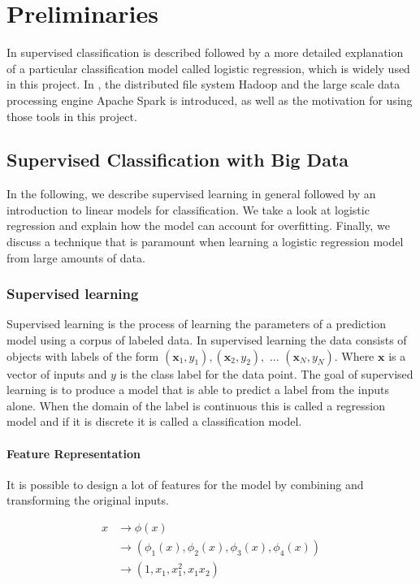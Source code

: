 \section{Preliminaries}\label{sec:prelim}
In  supervised classification is described followed by a more detailed explanation of a particular classification model called logistic regression, which is widely used in this project. In , the distributed file system Hadoop and the large scale data processing engine Apache Spark is introduced, as well as the motivation for using those tools in this project.

\subsection{Supervised Classification with Big Data}
\label{sec:supervisedclassification}
In the following, we describe supervised learning in general followed by an introduction to linear models for classification.
We take a look at logistic regression and explain how the model can account for overfitting. 
Finally, we discuss a technique that is paramount when learning a logistic regression model from large amounts of data.

\subsubsection{Supervised learning}
Supervised learning is the process of learning the parameters of a prediction model using a corpus of labeled data.
In supervised learning the data consists of objects with labels of the form 
$(\textbf{x}_1,y_1),(\textbf{x}_2,y_2), \text{ ... } (\textbf{x}_N,y_N)$.
Where $\textbf{x}$ is a vector of inputs and $y$ is the class label for the data point.
The goal of supervised learning is to produce a model that is able to predict a label from the inputs alone.
When the domain of the label is continuous this is called a regression model and if it is discrete it is called a classification model.

\paragraph{Feature Representation}\label{sec:phi}
It is possible to design a lot of features for the model by combining and transforming the original inputs.

\begin{align*}
x &\rightarrow \phi(x) \\
&\rightarrow (\phi_1(x), \phi_2(x), \phi_3(x), \phi_4(x)) \\
&\rightarrow (1, x_1, x_1^2, x_1x_2)
\end{align*} 

